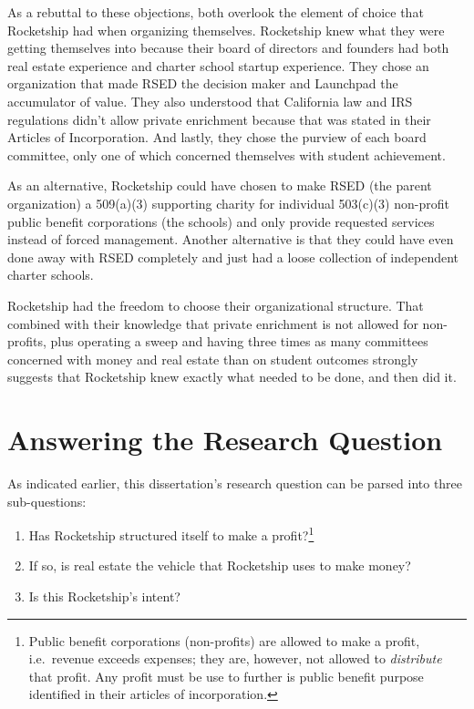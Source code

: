 As a rebuttal to these objections, both overlook the element of choice that Rocketship had when organizing themselves. Rocketship knew what they were getting themselves into because their board of directors and founders had both real estate experience and charter school startup experience. They chose an organization that made RSED the decision maker and Launchpad the accumulator of value. They also understood that California law and IRS regulations didn't allow private enrichment because that was stated in their Articles of Incorporation. And lastly, they chose the purview of each board committee, only one of which concerned themselves with student achievement.

As an alternative, Rocketship could have chosen to make RSED (the parent organization) a 509(a)(3) supporting charity for individual 503(c)(3) non-profit public benefit corporations (the schools) and only provide requested services instead of forced management. Another alternative is that they could have even done away with RSED completely and just had a loose collection of independent charter schools. 

Rocketship had the freedom to choose their organizational structure. That combined with their knowledge that private enrichment is not allowed for non-profits, plus operating a sweep and having three times as many committees concerned with money and real estate than on student outcomes strongly suggests that Rocketship knew exactly what needed to be done, and then did it.

\section{Answering the Research Question}%
\label{sec:answ-rese-quest}\indent%

As indicated earlier, this dissertation's research question can be parsed into three sub-questions:
\begin{enumerate}
  \item Has Rocketship structured itself to make a profit?\footnote{Public benefit corporations (non-profits) are allowed to make a profit, i.e.\ revenue exceeds expenses; they are, however, not allowed to \textit{distribute} that profit. Any profit must be use to further is public benefit purpose identified in their articles of incorporation.}
  \item If so, is real estate the vehicle that Rocketship uses to make money?
  \item Is this Rocketship's intent?
\end{enumerate}

